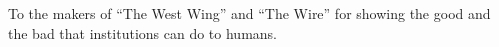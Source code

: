 \clearpage

\centering

\thispagestyle{empty}

\vspace*{\fill} %
	To the makers of ``The West Wing'' and ``The Wire'' for showing the good and the bad that institutions can do to humans. %

\vspace*{\fill} %